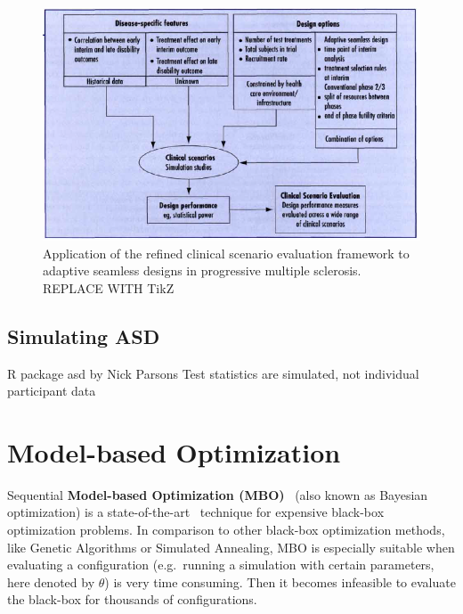 \documentclass[bimj,fleqn]{w-art}
\theoremstyle{plain}
\theoremstyle{definition}
\begin{document}
\begin{figure}[ht]
\centering
\includegraphics[width=\linewidth]{assets/friede_refinement_2010_fig2.png}
\caption{Application of the refined clinical scenario evaluation framework to adaptive seamless designs in progressive multiple sclerosis. REPLACE WITH TikZ}
\label{fig:friede_refinement_2010_fig2}
\end{figure}

\subsection{Simulating ASD}
\label{ssec:simulating_asd}
R package asd by Nick Parsons
Test statistics are simulated, not individual participant data

\clearpage

\section{Model-based Optimization}
\label{sec:model_based_optimization}

Sequential \textbf{Model-based Optimization (MBO)}~\citep{jones_taxonomy_2001} (also known as Bayesian optimization) is a state-of-the-art~\citep{shahriari_taking_2016} technique for expensive black-box optimization problems.
In comparison to other black-box optimization methods, like Genetic Algorithms or Simulated Annealing, MBO is especially suitable when evaluating a configuration (e.g.\ running a simulation with certain parameters, here denoted by $\theta$) is very time consuming.
Then it becomes infeasible to evaluate the black-box for thousands of configurations.
\end{document}
